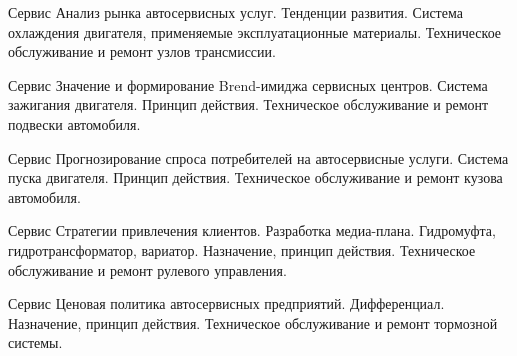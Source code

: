 \documentclass[
	11pt,
	a4paper,
	]
	{article}
\begin{document}
\vfill



\begin{minipage}[t][\miniH]{\miniL}\centering
	 {Сервис}
		{
			Анализ рынка автосервисных услуг. Тенденции развития.
		}{
			Система охлаждения двигателя, применяемые эксплуатационные материалы.
		}{
			Техническое обслуживание и ремонт узлов трансмиссии.
		}
	\lowGE
\end{minipage}





\begin{minipage}[t][\miniH]{\miniL}\centering
	 {Сервис}
		{
			Значение и формирование Brend-имиджа сервисных центров.
		}{
			Система зажигания двигателя. Принцип действия.
		}{
			Техническое обслуживание и ремонт подвески автомобиля.
		}
	\lowGE
\end{minipage}

\vfill



\begin{minipage}[t][\miniH]{\miniL}\centering
	 {Сервис}
		{
			Прогнозирование спроса потребителей на автосервисные услуги.
		}{
			Система пуска двигателя. Принцип действия.
		}{
			Техническое обслуживание и ремонт кузова автомобиля.
		}
	\lowGE
\end{minipage}

\vfill



\begin{minipage}[t][\miniH]{\miniL}\centering
	 {Сервис}
		{
			Стратегии привлечения клиентов. Разработка медиа-плана.
		}{
			Гидромуфта, гидротрансформатор, вариатор. Назначение, принцип действия.
		}{
			Техническое обслуживание и ремонт рулевого управления.
		}
	\lowGE
\end{minipage}





\begin{minipage}[t][\miniH]{\miniL}\centering
	 {Сервис}
		{
			Ценовая политика автосервисных предприятий.
		}{
			Дифференциал. Назначение, принцип действия.
		}{
			Техническое обслуживание и ремонт тормозной системы.
		}
	\lowGE
\end{minipage}

\vfill
\end{document}
